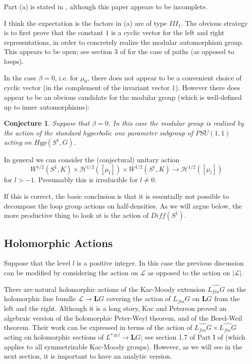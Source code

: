 \documentclass{amsart}
\theoremstyle{conjecture}
\newtheorem{conjecture}{Conjecture}
\theoremstyle{definition}
\theoremstyle{question}
\theoremstyle{questions}
\theoremstyle{remark}
\theoremstyle{remarks}
\theoremstyle{example}
\numberwithin{equation}{section}
\begin{document}
Part (a) is stated in \cite{AHTV}, although this paper appears to be incomplete.

I think the expectation is the factors in (a) are of type $III_1$. The obvious strategy is to first prove that the constant $1$ is a cyclic vector for the left and right representations, in order to concretely realize the modular automorphism group. This appears to be open; see section 3 of \cite{ADGV} for the case of paths (as opposed to loops).

In the case $\beta=0$, i.e. for $\mu_0$, there does not appear to be a convenient choice of cyclic vector
(in the complement of the invariant vector $1$). However there does appear to be an obvious candidate for the modular group (which is well-defined up to inner automorphisms):

\begin{conjecture}Suppose that $\beta=0$. In this case the modular group is realized by the action
of the standard hyperbolic one parameter subgroup of $PSU(1,1)$ acting on $Hyp(S^1,G)$.
\end{conjecture}

In general we can consider the (conjectural) unitary action
$$W^{1/2}(S^1,K)\times \mathcal H^{1/2}([\mu_l])\times W^{1/2}(S^1,K) \to \mathcal H^{1/2}([\mu_l])$$
for $l>-1$. Presumably this is irreducible for $l\ne 0$.

If this is correct, the basic conclusion is that it is essentially not possible to decompose the loop group actions
on half-densities. As we will argue below, the more productive thing to look at is the action of $Diff(S^1)$.

\subsection{Holomorphic Actions}

Suppose that the level $l$ is a positive integer. In this case the previous discussion can be modified
by considering the action on $\mathcal L$ as opposed to the action on $|\mathcal L|$.

There are natural holomorphic actions of the Kac-Moody extension $\widehat{L_{fin}G}$ on the holomorphic line bundle $\mathcal L \to \mathbf LG$ covering
the action of $L_{fin}G$ on $\mathbf L G$ from the left and the right. Although it is a long story,
Kac and Peterson proved an algebraic version of the holomorphic Peter-Weyl theorem, and of the Borel-Weil theorem.
Their work can be expressed in terms of the action
of $\widehat{L_{fin}G}\times\widehat{L_{fin}G}$ acting on holomorphic sections of
$L^{*\otimes l}\to \mathbf L G$; see section 1.7 of Part I of \cite{Pi1} (which applies to all symmetrizable Kac-Moody groups). However, as we will see in the next section, it is important to have an analytic version.
\end{document}
